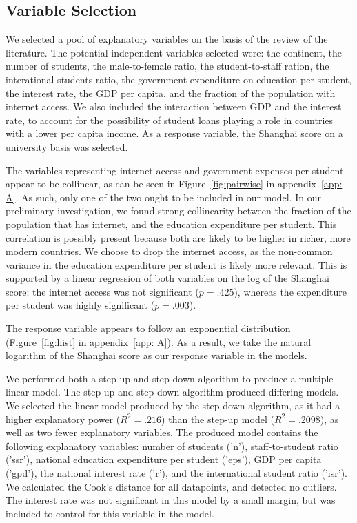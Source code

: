 \documentclass{stats_apa_style2}
\begin{document}
\subsection*{Variable Selection}
\label{Variable Selection}

We selected a pool of explanatory variables on the basis of the review of the
literature.
The potential independent variables selected were: the continent, the number of
students, the male-to-female ratio, the student-to-staff ration, the
interational students ratio, the government expenditure on education per
student, the interest rate, the GDP per capita, and the fraction of the population with internet
access. We also included the interaction between GDP and the interest rate, to
account for the possibility of student loans playing a role in countries with a
lower per capita income.
As a response variable, the Shanghai score on a university basis was selected.

The variables representing internet access and government expenses per student
appear to be collinear, as can be seen in Figure~\ref{fig:pairwise} in
appendix~\ref{app: A}. As such, only one of the two ought to be included in our
model. In our preliminary investigation, we found strong collinearity between
the fraction of the population that has internet, and the education expenditure
per student. This correlation is possibly present because both are likely to be
higher in richer, more modern countries. We choose to drop the internet access, as the
non-common variance in the education expenditure per student is likely more
relevant. This is supported by a linear regression of both variables on the log
of the Shanghai score: the internet access was not significant ($p=.425$),
whereas the expenditure per student was highly significant ($p=.003$).

The response variable appears to follow an exponential distribution (Figure~\ref{fig:hist} in appendix~\ref{app: A}). As a result, we take the natural logarithm of the Shanghai score as our response variable in the models.

We performed both a step-up and step-down algorithm to produce a multiple linear
model. The step-up and step-down algorithm produced differing models. We
selected the linear model produced by the step-down algorithm, as it had a
higher explanatory power ($R^2 = .216$) than the step-up model ($R^2 = .2098$),
as well as two fewer explanatory variables. The produced model contains the
following explanatory variables: number of students ('n'), staff-to-student
ratio ('ssr'), national education expenditure per student ('eps'), GDP per
capita ('gpd'), the national interest rate ('r'), and the international student
ratio ('isr'). We calculated the Cook's distance for all datapoints, and
detected no outliers. The interest rate was not significant in this model by a
small margin, but was included to control for this variable in the model.
\end{document}
